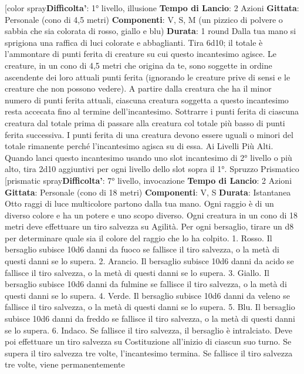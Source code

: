 \begin{multicols}{2}
[color spray\textbf{Difficolta'}:
1° livello, illusione
\textbf{Tempo di Lancio}: 2 Azioni
\textbf{Gittata}: Personale (cono di 4,5 metri)
\textbf{Componenti}: V, S, M (un pizzico di polvere o sabbia
che sia colorata di rosso, giallo e blu)
\textbf{Durata}: 1 round
Dalla tua mano si sprigiona una raffica di luci colorate e
abbaglianti. Tira 6d10; il totale è l’ammontare di punti
ferita di creature su cui questo incantesimo agisce. Le
creature, in un cono di 4,5 metri che origina da te, sono
soggette in ordine ascendente dei loro attuali punti
ferita (ignorando le creature prive di sensi e le creature
che non possono vedere).
A partire dalla creatura che ha il minor numero di punti
ferita attuali, ciascuna creatura soggetta a questo
incantesimo resta accecata fino al termine
dell’incantesimo. Sottrarre i punti ferita di ciascuna
creatura dal totale prima di passare alla creatura col
totale più basso di punti ferita successiva. I punti ferita
di una creatura devono essere uguali o minori del totale
rimanente perché l’incantesimo agisca su di essa.
Ai Livelli Più Alti. Quando lanci questo incantesimo
usando uno slot incantesimo di 2° livello o più alto, tira
2d10 aggiuntivi per ogni livello dello slot sopra il 1°.
Spruzzo Prismatico
[prismatic spray\textbf{Difficolta'}:
7° livello, invocazione
\textbf{Tempo di Lancio}: 2 Azioni
\textbf{Gittata}: Personale (cono di 18 metri)
\textbf{Componenti}: V, S
\textbf{Durata}: Istantanea
Otto raggi di luce multicolore partono dalla tua mano.
Ogni raggio è di un diverso colore e ha un potere e uno
scopo diverso. Ogni creatura in un cono di 18 metri
deve effettuare un tiro salvezza su Agilità. Per ogni
bersaglio, tirare un d8 per determinare quale sia il
colore del raggio che lo ha colpito.
1. Rosso. Il bersaglio subisce 10d6 danni da fuoco se
fallisce il tiro salvezza, o la metà di questi danni se lo
supera.
2. Arancio. Il bersaglio subisce 10d6 danni da acido se
fallisce il tiro salvezza, o la metà di questi danni se lo
supera.
3. Giallo. Il bersaglio subisce 10d6 danni da fulmine se
fallisce il tiro salvezza, o la metà di questi danni se lo
supera.
4. Verde. Il bersaglio subisce 10d6 danni da veleno se
fallisce il tiro salvezza, o la metà di questi danni se lo
supera.
5. Blu. Il bersaglio subisce 10d6 danni da freddo se
fallisce il tiro salvezza, o la metà di questi danni se lo
supera.
6. Indaco. Se fallisce il tiro salvezza, il bersaglio è
intralciato. Deve poi effettuare un tiro salvezza su
Costituzione all’inizio di ciascun suo turno. Se supera il
tiro salvezza tre volte, l’incantesimo termina. Se fallisce
il tiro salvezza tre volte, viene permanentemente

\end{multicols}
